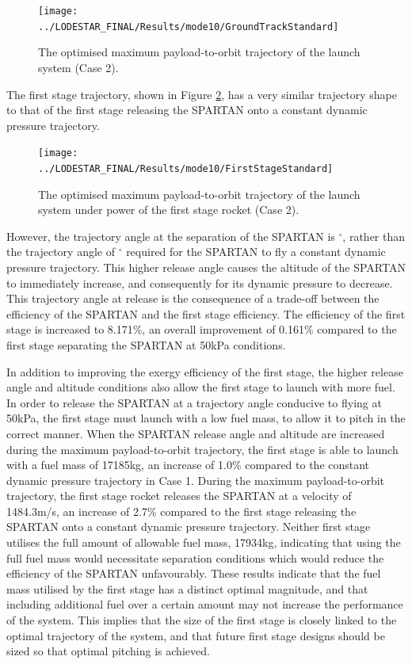 \begin{figure}[ht!]
	
	
	
	\centering
	\texttt{[image: ../LODESTAR\_FINAL/Results/mode10/GroundTrackStandard]}
	\caption{The optimised maximum payload-to-orbit trajectory of the launch system (Case 2).}
	\label{fig:GroundTrackStandardNoReturn}
\end{figure}


The first stage trajectory, shown in Figure \ref{fig:FirstStageStandardNoReturn}, has a very similar trajectory shape to that of the first stage releasing the SPARTAN onto a constant dynamic pressure trajectory.
\begin{figure}[ht!]
	\centering
	\texttt{[image: ../LODESTAR\_FINAL/Results/mode10/FirstStageStandard]}
	\caption{The optimised maximum payload-to-orbit trajectory of the launch system under power of the first stage rocket (Case 2).}
	\label{fig:FirstStageStandardNoReturn}
\end{figure}
 However, the trajectory angle at the separation of the SPARTAN is \secondthirdSeparationgammaqStandardNoReturn$^\circ$, rather than the trajectory angle of \secondthirdSeparationgammaConstq$^\circ$ required for the SPARTAN to fly a constant dynamic pressure trajectory. This higher release angle causes the altitude of the SPARTAN to immediately increase, and consequently for its dynamic pressure to decrease. This trajectory angle at release is the consequence of a trade-off between the efficiency of the SPARTAN and the first stage efficiency. The efficiency of the first stage is increased to 8.171\%, an overall improvement of 0.161\% compared to the first stage separating the SPARTAN at 50kPa conditions. 
 
 In addition to improving the exergy efficiency of the first stage, the higher release angle and altitude conditions also allow the first stage to launch with more fuel. In order to release the SPARTAN at a trajectory angle conducive to flying at 50kPa, the first stage must launch with a low fuel mass, to allow it to pitch in the correct manner. When the SPARTAN release angle and altitude are increased during the maximum payload-to-orbit trajectory, the first stage is able to launch with a fuel mass of 17185kg, an increase of 1.0\% compared to the constant dynamic pressure trajectory in Case 1. During the maximum payload-to-orbit trajectory, the first stage rocket releases the SPARTAN at a velocity of 1484.3m/s, an increase of 2.7\% compared to the first stage releasing the SPARTAN onto a constant dynamic pressure trajectory. Neither first stage utilises the full amount of allowable fuel mass, 17934kg, indicating that using the full fuel mass would necessitate separation conditions which would reduce the efficiency of the SPARTAN unfavourably. 
These results indicate that the fuel mass utilised by the first stage has a distinct optimal magnitude, and that including additional fuel over a certain amount may not increase the performance of the system. This implies that the size of the first stage is closely linked to the optimal trajectory of the system, and that future first stage designs should be sized so that optimal pitching is achieved. 


